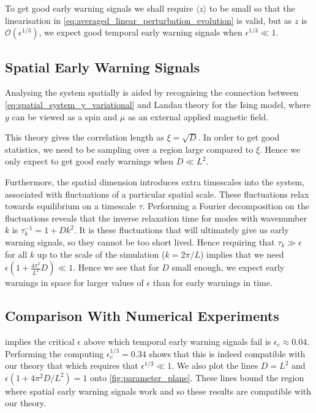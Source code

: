   To get good early warning signals we shall require $\langle z\rangle$ to be small so that the linearisation in
  \cref{eq:averaged_linear_perturbation_evolution} is valid, but as $z$ is $\mathcal{O}\left(\epsilon^{1/3}\right)$\cite{Berglund2006},
  we expect good temporal early warning signals when $\epsilon^{1/3} \ll 1$.

  \subsection{Spatial Early Warning Signals}
  Analysing the system spatially is aided by recognising the connection between \cref{eq:spatial_system_y_variational} and Landau theory for the Ising
  model\cite{goldenfeld1992}, where
  $y$ can be viewed as a spin and $\mu$ as an external applied magnetic field.

  This theory gives the correlation length as $\xi = \sqrt{D}$. In order to get good statistics, we need to be sampling over a region
  large compared to $\xi$. Hence we only expect to get good early warnings when $D \ll L^2$.

      Furthermore, the spatial dimension introduces extra timescales into the system, associated with
    fluctuations of a particular spatial scale. These fluctuations relax towards 
    equilibrium on a timescale $\tau$. Performing a
    Fourier decomposition on the fluctuations reveals that the inverse relaxation time
    for modes with wavenumber $k$ is $\tau_k^{-1} = 1 + Dk^2$. It is these fluctuations that will ultimately
    give us early warning signals, so they cannot be too short lived. Hence requiring that 
    $\tau_k \gg \epsilon$
    for all $k$ up to the scale of the simulation ($k = 2\pi/L$) implies
    that we need $\epsilon(1+\frac{4\pi^2}{L^2} D)\ll 1$. Hence we see that for $D$ small enough, we 
    expect early warnings in space for larger values of $\epsilon$ than for early warnings in time.

    \subsection{Comparison With Numerical Experiments}
     implies the critical $\epsilon$ above which temporal early warning signals fail is $\epsilon_c \approx 0.04$.
    Performing the computing $\epsilon_c^{1/3} = 0.34$ shows that this is indeed compatible with our theory that which requires that
    $\epsilon^{1/3} \ll 1$. We also plot the lines $D = L^2$ and $\epsilon\left(1 + 4\pi^2 D/L^2\right) = 1$ onto \cref{fig:parameter_plane}.
    These lines bound the region where spatial early warning signals work and so these results are compatible with our theory.
